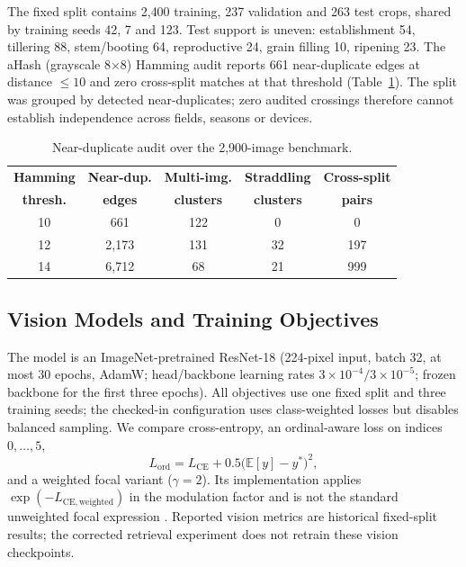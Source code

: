 \documentclass[conference,a4paper]{IEEEtran}
\begin{document}
The fixed split contains 2{,}400 training, 237 validation and 263 test crops, shared by training seeds 42, 7 and 123. Test support is uneven: establishment 54, tillering 88, stem/booting 64, reproductive 24, grain filling 10, ripening 23. The aHash (grayscale 8$\times$8) Hamming audit reports 661 near-duplicate edges at distance $\leq10$ and zero cross-split matches at that threshold (Table~\ref{tab:phash}). The split was grouped by detected near-duplicates; zero audited crossings therefore cannot establish independence across fields, seasons or devices.

\begin{table}[t]
\centering
\caption{Near-duplicate audit over the 2,900-image benchmark.}
\label{tab:phash}
\footnotesize
\begin{tabular}{ccccc}
\toprule
\textbf{Hamming} & \textbf{Near-dup.} & \textbf{Multi-img.} & \textbf{Straddling} & \textbf{Cross-split} \\
\textbf{thresh.} & \textbf{edges} & \textbf{clusters} & \textbf{clusters} & \textbf{pairs} \\
\midrule
10 & 661   & 122 & 0  & 0 \\
12 & 2{,}173 & 131 & 32 & 197 \\
14 & 6{,}712 & 68  & 21 & 999 \\
\bottomrule
\end{tabular}
\end{table}

\subsection{Vision Models and Training Objectives}

The model is an ImageNet-pretrained ResNet-18 (224-pixel input, batch 32, at most 30 epochs, AdamW; head/backbone learning rates $3\times10^{-4}/3\times10^{-5}$; frozen backbone for the first three epochs). All objectives use one fixed split and three training seeds; the checked-in configuration uses class-weighted losses but disables balanced sampling. We compare cross-entropy, an ordinal-aware loss on indices $0,\ldots,5$,
\begin{equation}
L_{\mathrm{ord}}=L_{\mathrm{CE}}+0.5\bigl(\mathbb{E}[y]-y^*\bigr)^2,
\label{eq:ordinal}
\end{equation}
and a weighted focal variant ($\gamma=2$). Its implementation applies $\exp(-L_{\mathrm{CE,weighted}})$ in the modulation factor and is not the standard unweighted focal expression \cite{lin2017focal}. Reported vision metrics are historical fixed-split results; the corrected retrieval experiment does not retrain these vision checkpoints.
\end{document}

